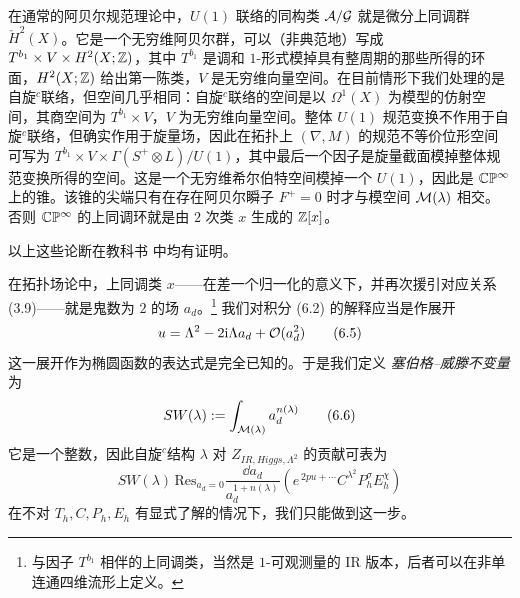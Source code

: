 在通常的阿贝尔规范理论中，$U(1)$ 联络的同构类 $\mathcal{A}/\mathcal{G}$ 就是微分上同调群 $\check{H}^{2}(X)$。它是一个无穷维阿贝尔群，可以（非典范地）写成 $T^{b_1}\times V\times H^{2}(X;\mathbb{Z})$，其中 $T^{b_1}$ 是调和 $1$-形式模掉具有整周期的那些所得的环面，$H^{2}(X;\mathbb{Z})$ 给出第一陈类，$V$ 是无穷维向量空间。在目前情形下我们处理的是自旋$^{c}$联络，但空间几乎相同：自旋$^{c}$联络的空间是以 $\Omega^{1}(X)$ 为模型的仿射空间，其商空间为 $T^{b_1}\times V$，$V$ 为无穷维向量空间。整体 $U(1)$ 规范变换不作用于自旋$^{c}$联络，但确实作用于旋量场，因此在拓扑上 $(\nabla,M)$ 的规范不等价位形空间可写为 $T^{b_1}\times V\times\Gamma(S^{+}\otimes L)/U(1)$，其中最后一个因子是旋量截面模掉整体规范变换所得的空间。这是一个无穷维希尔伯特空间模掉一个 $U(1)$，因此是 $\mathbb{C}\mathbb{P}^{\infty}$ 上的锥。该锥的尖端只有在存在阿贝尔瞬子 $F^{+}=0$ 时才与模空间 $\mathcal{M}(\lambda)$ 相交。否则 $\mathbb{C}\mathbb{P}^{\infty}$ 的上同调环就是由 $2$ 次类 $x$ 生成的 $\mathbb{Z}[x]$。

以上这些论断在教科书 \cite{ref17,ref48,ref42} 中均有证明。

在拓扑场论中，上同调类 $x$——在差一个归一化的意义下，并再次援引对应关系 (3.9)——就是鬼数为 $2$ 的场 $a_d$。\footnote{与因子 $T^{b_1}$ 相伴的上同调类，当然是 $1$-可观测量的 IR 版本，后者可以在非单连通四维流形上定义。} 我们对积分 (6.2) 的解释应当是作展开
\begin{equation}
u=\Lambda^{2}-2\mathrm{i}\Lambda a_d+\mathcal{O}(a_d^{2})
\tag{6.5}
\end{equation}
这一展开作为椭圆函数的表达式是完全已知的。于是我们定义 \emph{塞伯格--威滕不变量}为
\begin{equation}
SW(\lambda):=\int_{\mathcal{M}(\lambda)}a_d^{n(\lambda)}
\tag{6.6}
\end{equation}
它是一个整数，因此自旋$^{c}$结构 $\lambda$ 对 $Z_{IR,Higgs,\Lambda^{2}}$ 的贡献可表为
\begin{equation}
SW(\lambda)\,
\mathrm{Res}_{a_d=0}\frac{\dd a_d}{a_d^{1+n(\lambda)}}
\left(e^{\,2pu+\cdots}C^{\lambda^{2}}P_h^{\sigma}E_h^{\chi}\right)
\tag{6.7}
\end{equation}
在不对 $T_h,C,P_h,E_h$ 有显式了解的情况下，我们只能做到这一步。

